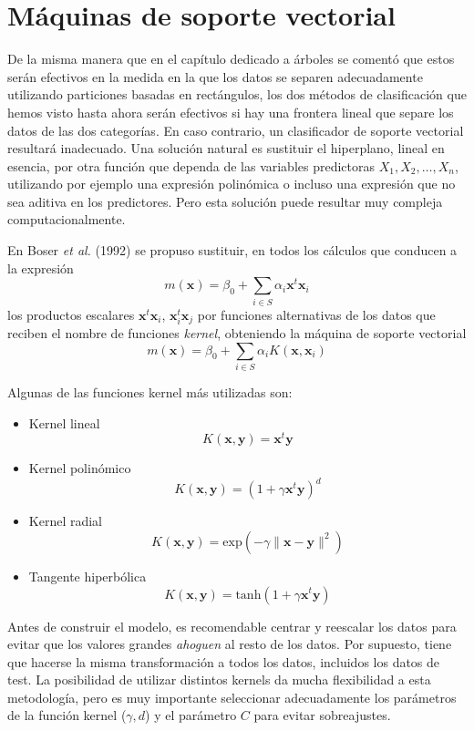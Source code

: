 \documentclass[
]{book}
\theoremstyle{break}
\theoremstyle{definition}
\theoremstyle{definition}
\theoremstyle{definition}
\theoremstyle{definition}
\theoremstyle{remark}
\begin{document}
\hypertarget{muxe1quinas-de-soporte-vectorial}{%
\section{Máquinas de soporte vectorial}\label{muxe1quinas-de-soporte-vectorial}}

De la misma manera que en el capítulo dedicado a árboles se comentó que estos serán efectivos en la medida en la que los datos se separen adecuadamente utilizando particiones basadas en rectángulos, los dos métodos de clasificación que hemos visto hasta ahora serán efectivos si hay una frontera lineal que separe los datos de las dos categorías. En caso contrario, un clasificador de soporte vectorial resultará inadecuado. Una solución natural es sustituir el hiperplano, lineal en esencia, por otra función que dependa de las variables predictoras \(X_1,X_2, \ldots, X_n\), utilizando por ejemplo una expresión polinómica o incluso una expresión que no sea aditiva en los predictores. Pero esta solución puede resultar muy compleja computacionalmente.

En Boser \emph{et al.} (1992) se propuso sustituir, en todos los cálculos que conducen a la expresión
\[m(\mathbf{x}) = \beta_0 + \sum_{i\in S} \alpha_i \mathbf{x}^t \mathbf{x}_i\]
los productos escalares \(\mathbf{x}^t \mathbf{x}_i\), \(\mathbf{x}_i^t \mathbf{x}_j\) por funciones alternativas de los datos que reciben el nombre de funciones \emph{kernel}, obteniendo la máquina de soporte vectorial
\[m(\mathbf{x}) = \beta_0 + \sum_{i\in S} \alpha_i K(\mathbf{x}, \mathbf{x}_i)\]

Algunas de las funciones kernel más utilizadas son:

\begin{itemize}
\item
  Kernel lineal
  \[K(\mathbf{x}, \mathbf{y}) = \mathbf{x}^t \mathbf{y}\]
\item
  Kernel polinómico
  \[K(\mathbf{x}, \mathbf{y}) = (1 + \gamma \mathbf{x}^t \mathbf{y})^d\]
\item
  Kernel radial
  \[K(\mathbf{x}, \mathbf{y}) = \mbox{exp} (-\gamma \| \mathbf{x} - \mathbf{y} \|^2)\]
\item
  Tangente hiperbólica
  \[K(\mathbf{x}, \mathbf{y}) = \mbox{tanh} (1 + \gamma \mathbf{x}^t \mathbf{y})\]
\end{itemize}

Antes de construir el modelo, es recomendable centrar y reescalar los datos para evitar que los valores grandes \emph{ahoguen} al resto de los datos. Por supuesto, tiene que hacerse la misma transformación a todos los datos, incluidos los datos de test. La posibilidad de utilizar distintos kernels da mucha flexibilidad a esta metodología, pero es muy importante seleccionar adecuadamente los parámetros de la función kernel (\(\gamma,d\)) y el parámetro \(C\) para evitar sobreajustes.
\end{document}

